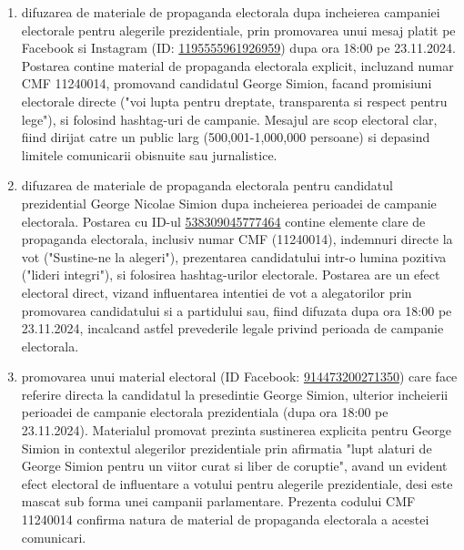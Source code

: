 \documentclass[a4paper,12pt]{article}
\begin{document}
\begin{enumerate}[leftmargin=*, label=\arabic*.)]
    \item difuzarea de materiale de propaganda electorala dupa incheierea campaniei electorale pentru alegerile prezidentiale, prin promovarea unui mesaj platit pe Facebook si Instagram (ID: \href{https://www.facebook.com/ads/library/?id=1195555961926959}{1195555961926959}) dupa ora 18:00 pe 23.11.2024. Postarea contine material de propaganda electorala explicit, incluzand numar CMF 11240014, promovand candidatul George Simion, facand promisiuni electorale directe ("voi lupta pentru dreptate, transparenta si respect pentru lege"), si folosind hashtag-uri de campanie. Mesajul are scop electoral clar, fiind dirijat catre un public larg (500,001-1,000,000 persoane) si depasind limitele comunicarii obisnuite sau jurnalistice.
    \item difuzarea de materiale de propaganda electorala pentru candidatul prezidential George Nicolae Simion dupa incheierea perioadei de campanie electorala. Postarea cu ID-ul \href{https://www.facebook.com/ads/library/?id=538309045777464}{538309045777464} contine elemente clare de propaganda electorala, inclusiv numar CMF (11240014), indemnuri directe la vot ("Sustine-ne la alegeri"), prezentarea candidatului intr-o lumina pozitiva ("lideri integri"), si folosirea hashtag-urilor electorale. Postarea are un efect electoral direct, vizand influentarea intentiei de vot a alegatorilor prin promovarea candidatului si a partidului sau, fiind difuzata dupa ora 18:00 pe 23.11.2024, incalcand astfel prevederile legale privind perioada de campanie electorala.
    \item promovarea unui material electoral (ID Facebook: \href{https://www.facebook.com/ads/library/?id=914473200271350}{914473200271350}) care face referire directa la candidatul la presedintie George Simion, ulterior incheierii perioadei de campanie electorala prezidentiala (dupa ora 18:00 pe 23.11.2024). Materialul promovat prezinta sustinerea explicita pentru George Simion in contextul alegerilor prezidentiale prin afirmatia "lupt alaturi de George Simion pentru un viitor curat si liber de coruptie", avand un evident efect electoral de influentare a votului pentru alegerile prezidentiale, desi este mascat sub forma unei campanii parlamentare. Prezenta codului CMF 11240014 confirma natura de material de propaganda electorala a acestei comunicari.
\end{enumerate}

\vspace{0.5cm}
\end{document}
